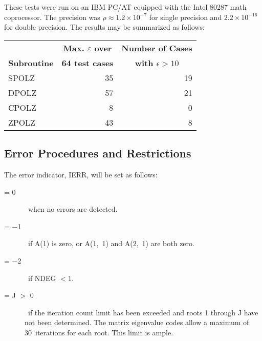 \documentclass[twoside]{MATH77}
\begin{document}
These tests were run on an IBM PC/{AT} equipped with the Intel 80287 math
coprocessor. The precision was $\rho \approx 1.2 \times 10^{-7}$ for single
precision and $2.2\times 10^{-16}$ for double precision. The results may be
summarized as follows:

\begin{tabular}{lrr}
    & \multicolumn{1}{c}{\bf
Max. $\varepsilon $ over}  &  \multicolumn{1}{c}{\bf Number of Cases}\\
  \multicolumn{1}{c}{\bf Subroutine} & \multicolumn{1}{c}{\bf 64 test cases} &
  \multicolumn{1}{c}{\bf with $\epsilon >10$}  \\
  \hspace{.15in} SPOLZ   &  35 \hspace{.3in}   &  19 \hspace{.5in}  \\
  \hspace{.15in} DPOLZ   &  57 \hspace{.3in}  &  21 \hspace{.5in} \\
  \hspace{.15in} CPOLZ   &    8 \hspace{.3in}   &    0 \hspace{.5in} \\
  \hspace{.15in} ZPOLZ   &  43  \hspace{.3in}  &    8 \hspace{.5in}
\end{tabular}




\subsection{Error Procedures and Restrictions}

The error indicator, IERR, will be set as follows:

\begin{description}
\item[\rm = 0]  \ when no errors are detected.

\item[\rm = $-$1]  \ if A(1) is zero, or A(1,~1) and A(2,~1) are both zero.

\item[\rm = $-$2]  \ if NDEG $<1.$

\item[\rm = J $>$ 0]  \ if the iteration count limit has been exceeded and
roots 1 through J have not been determined. The matrix eigenvalue codes
allow a maximum of 30~iterations for each root. This limit is ample.
\end{description}
\end{document}
